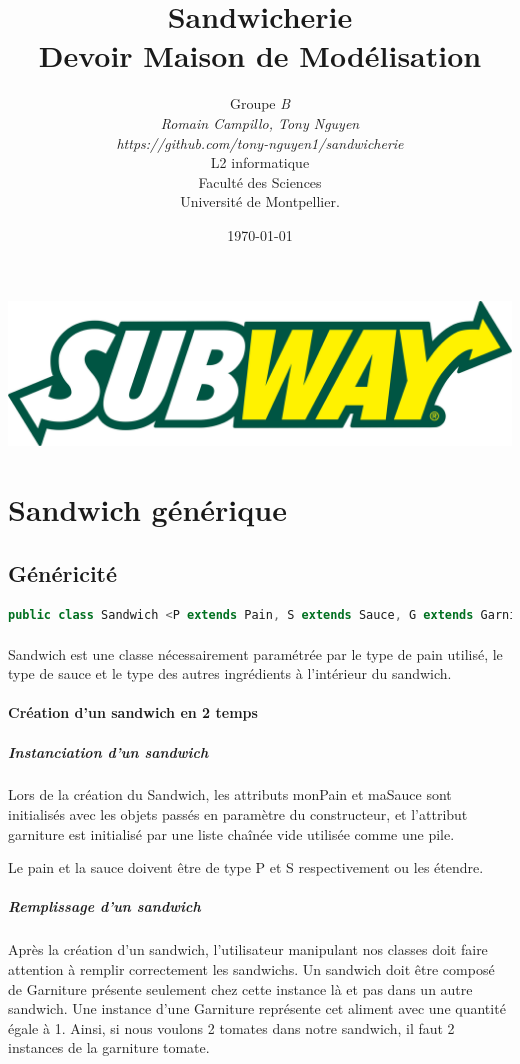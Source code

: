 \documentclass[a4paper]{article}
\title{Sandwicherie\\         %
Devoir Maison de Modélisation}
\author{Groupe \emph{B}\\
  \emph{Romain Campillo, Tony Nguyen}\\
  \emph{https://github.com/tony-nguyen1/sandwicherie}\\
  L2 informatique\\
  Faculté des Sciences\\
Université de Montpellier.}
\date{\today}
\begin{document}
\maketitle
\begin{center}
    \includegraphics[scale=0.09]{./logo.png}
\end{center}
\newpage
\tableofcontents
\clearpage
\section{Sandwich générique}
\subsection{Généricité}

\begin{lstlisting}[language=Java, caption=Entête de class Sandwich]
    public class Sandwich <P extends Pain, S extends Sauce, G extends Garniture>
\end{lstlisting}
\paragraph{}
Sandwich est une classe nécessairement paramétrée par le type de pain utilisé, le type de sauce et le type des autres ingrédients à l'intérieur du sandwich.

\paragraph{Création d'un sandwich en 2 temps}
\subparagraph{Instanciation d'un sandwich}
Lors de la création du Sandwich, les attributs monPain et maSauce sont initialisés avec les objets passés en paramètre du constructeur, et l’attribut garniture est initialisé par une liste chaînée vide utilisée comme une pile.

Le pain et la sauce doivent être de type P et S respectivement ou les étendre.

\subparagraph{Remplissage d'un sandwich}
Après la création d'un sandwich, l'utilisateur manipulant nos classes doit faire attention à remplir correctement les sandwichs. Un sandwich doit être composé de Garniture présente seulement chez cette instance là et pas dans un autre sandwich. Une instance d'une Garniture représente cet aliment avec une quantité égale à 1. Ainsi, si nous voulons 2 tomates dans notre sandwich, il faut 2 instances de la garniture tomate.
\end{document}
